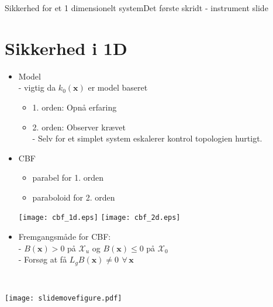 \begin{frame}{Sikkerhed for et 1 dimensionelt system}{Det første skridt - instrument slide}
\section{Sikkerhed i 1D}
\vspace*{-0.5cm}
\begin{minipage}{0.6\textwidth}
\begin{block}{}
	\begin{itemize}
		\item Model \\
		\scriptsize - vigtig da $k_0(\textbf{x})$ er model baseret
		\begin{itemize}
			\item 1. orden: Opnå erfaring
			\item 2. orden: Observer krævet \\ 
			\scriptsize - Selv for et simplet system eskalerer kontrol topologien hurtigt.
		\end{itemize}	
		\item \normalsize CBF
		\begin{itemize}
			\item parabel for 1. orden
			\item paraboloid for 2. orden
		\end{itemize}
			\texttt{[image: cbf\_1d.eps]} \hspace{0.2cm}
			\texttt{[image: cbf\_2d.eps]}
		\item Fremgangsmåde for CBF: \\
		\scriptsize - $B(\textbf{x}) > 0$ på  $\mathcal{X}_u$ og  $B(\textbf{x}) \leq 0$ på  $\mathcal{X}_0$ \\
		- Forsøg at få $L_gB(\textbf{x}) \neq 0 \,\ \forall \, \textbf{x}$
	\end{itemize}
	{\color{white}{lol}}\\
	{\color{white}{lol}}
\end{block}
\vspace{-0.7cm}
\scriptsize
\end{minipage}
\hspace{0.3cm}
\vspace*{-1cm}
\begin{minipage}{0.35\textwidth}
\hspace*{-0.5cm}
\texttt{[image: slidemovefigure.pdf]}



\end{minipage}
\end{frame}
